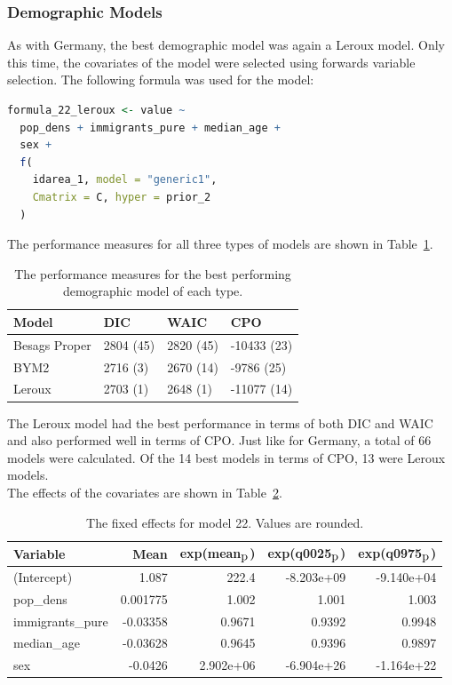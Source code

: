 \subsubsection{Demographic Models}
As with Germany, the best demographic model was again a Leroux model. Only this time, the covariates of the model were selected using forwards variable selection. The following formula was used for the model:
\begin{lstlisting}[caption={The formula for the best Leroux model based on the demographic variables}, label={codeDemoNorway}, language = R]
formula_22_leroux <- value ~
  pop_dens + immigrants_pure + median_age +
  sex +
  f(
    idarea_1, model = "generic1",
    Cmatrix = C, hyper = prior_2
  )
\end{lstlisting}
The performance measures for all three types of models are shown in Table~\ref{demoNorway}.
\begin{table}[H] 
\caption{The performance measures for the best performing demographic model of each type. \label{demoNorway}}
\begin{tabular}{l l l l}
\toprule
\textbf{Model}	& \textbf{DIC}	& \textbf{WAIC} & \textbf{CPO} \\
\midrule
Besags Proper  & 2804 (45) & 2820 (45) & -10433 (23) \\
BYM2 & 2716 (3) & 2670 (14) & -9786 (25)\\
Leroux & 2703 (1) & 2648 (1) & -11077 (14) \\
\bottomrule
\end{tabular}
\end{table}
The Leroux model had the best performance in terms of both DIC and WAIC and also performed well in terms of CPO. Just like for Germany, a total of 66 models were calculated. Of the 14 best models in terms of CPO, 13 were Leroux models. \\
The effects of the covariates are shown in Table~\ref{fixedDemoNorway}.
\begin{table}[H] 
\caption{The fixed effects for model 22. Values are rounded. \label{fixedDemoNorway}}
\begin{tabular}{l r r r r}
\toprule
\textbf{Variable}	& \textbf{Mean}	& \textbf{exp(mean$_{\hbox{p}}$)} & \textbf{exp(q0025$_{\hbox{p}}$)} & \textbf{exp(q0975$_{\hbox{p}}$)} \\
\midrule
(Intercept) & 1.087 & 222.4 & -8.203e+09 & -9.140e+04\\
pop\_dens & 0.001775 & 1.002 & 1.001 & 1.003\\
immigrants\_pure & -0.03358 & 0.9671 & 0.9392 & 0.9948\\
median\_age & -0.03628  & 0.9645 & 0.9396 & 0.9897\\
sex & -0.0426 & 2.902e+06 & -6.904e+26 & -1.164e+22 \\
\bottomrule
\end{tabular}
\end{table}
